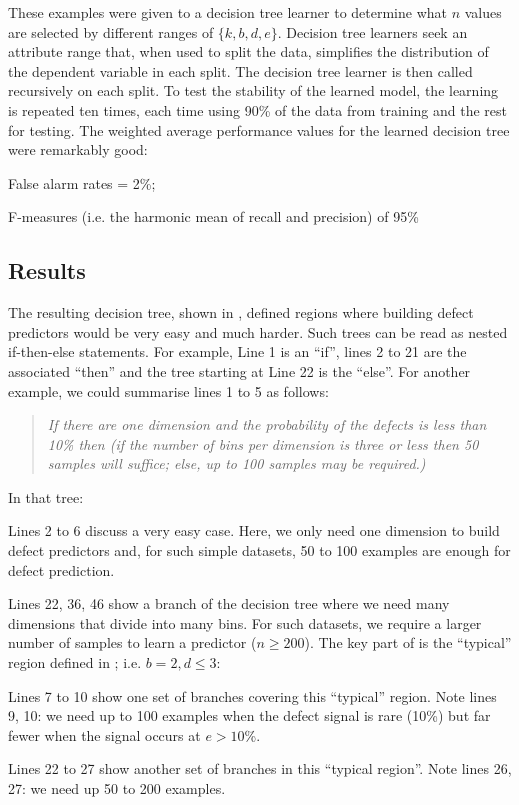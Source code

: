     These examples were given to a decision tree learner to determine what $n$ values are selected by different
    ranges of $\{k,b,d,e\}$. Decision tree learners seek an attribute range that, when used to split the data,
      simplifies the distribution of the dependent variable in each split.
      The decision tree learner is then called recursively on each split.  
      To test the stability of the learned model, the learning is repeated ten times, each time using 90\% of the data from training and the rest
      for testing. The weighted average performance values for the learned decision tree were remarkably good:
\squishlist
    \item False alarm rates = 2\%;
    \item F-measures (i.e. the harmonic mean of recall and precision) of 95\%
\squishend

\subsection{Results}

The resulting decision tree, shown in , defined regions where
building defect predictors would be very easy and much harder.
Such trees can be read as nested if-then-else statements. For example, Line 1 is an ``if'',
lines 2 to 21 are the associated ``then'' and the tree starting at Line 22 is the ``else''.
For another example, we could summarise lines 1 to 5 as follows:
\begin{quote}
{\em If there are one dimension and the probability of the defects is less than 10\% then (if
the number of bins per dimension is three or less then 50 samples will suffice; else, up to 100
samples may be required.)}
\end{quote}
In that tree:
\squishlist
\item
Lines 2 to 6 discuss a very easy case. Here, we only need
one dimension to build defect predictors and,
for such simple datasets, 50 to 100 examples are enough for defect prediction.
\item
Lines 22, 36, 46 show a branch of the decision tree
where we need many dimensions that divide into many bins.
For such datasets, we require a larger number of samples to learn a predictor ($n \ge 200$).
\squishend
The key part of  is the ``typical'' region defined in ;
i.e.    $b=2, d \le 3$:
\squishlist
\item Lines 7 to 10 show one set of branches covering this ``typical'' region. Note
lines 9, 10:  we need up to 100 examples when the defect signal is rare (10\%) but
far fewer when the signal occurs at $e>10$\%.
\item
Lines 22 to 27 show another set of branches in this ``typical region''. Note lines 26, 27:
we need up 50 to 200 examples.
\squishend
